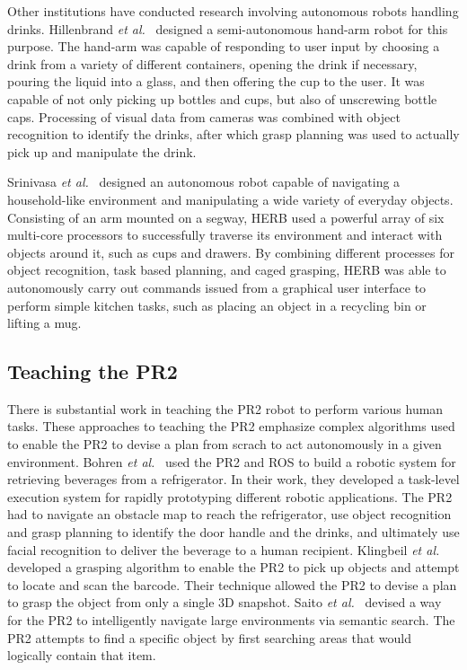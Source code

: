 \documentclass{sig-alternate}
\begin{document}
\indent Other institutions have conducted research involving autonomous robots handling
drinks. Hillenbrand \textit{et al.}~\cite{pouring_arm} designed a 
semi-autonomous hand-arm robot for this purpose. The hand-arm was capable of 
responding to user input by choosing a drink from a variety of different 
containers, opening the drink if necessary, pouring the liquid into a glass, 
and then offering the cup to the user. It was capable of not only picking up 
bottles and cups, but also of unscrewing bottle caps. Processing of visual data
from cameras was combined with object recognition to identify the drinks, after
which grasp planning was used to actually pick up and manipulate the drink.

\indent Srinivasa \textit{et al.}~\cite{herb} designed an autonomous robot capable of 
navigating a household-like environment and manipulating a wide variety of 
everyday objects. Consisting of an arm mounted on a segway, HERB used a 
powerful array of six multi-core processors to successfully traverse its 
environment and interact with objects around it, such as cups and drawers. By 
combining different processes for object recognition, task based planning, and 
caged grasping, HERB was able to autonomously carry out commands issued from a 
graphical user interface to perform simple kitchen tasks, such as placing an 
object in a recycling bin or lifting a mug.

\subsection{Teaching the PR2}
\label{sec:teach_pr2}
\indent There is substantial work in teaching the PR2 robot to perform various human tasks.  These approaches to teaching the PR2 emphasize complex algorithms used 
to enable the PR2 to devise a plan from scrach to act autonomously in a 
given environment.  Bohren \textit{et al.}~\cite{beer} used the PR2 and ROS to build a robotic 
system for retrieving beverages from a refrigerator. In their work, they developed a task-level execution system for rapidly prototyping different robotic applications. 
The PR2 had to navigate an obstacle map to reach the refrigerator, use object recognition and grasp planning to identify the door handle and the drinks, and ultimately use 
facial recognition to deliver the beverage to a human recipient. 
Klingbeil \textit{et al.}~\cite{groceries} developed a grasping algorithm to enable the PR2 to pick up objects and attempt to locate and scan the barcode. Their 
technique allowed the PR2 to devise a plan to grasp the object from only a single 3D snapshot.
Saito \textit{et al.}~\cite{subway} devised a way for the PR2 to intelligently 
navigate large environments via semantic search. The PR2 attempts to find a specific object by first searching areas that would logically contain that item.
\end{document}

